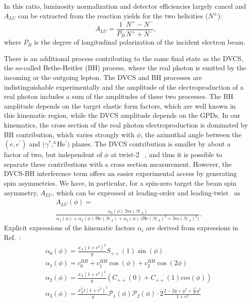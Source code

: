 \documentclass[twocolumn,nofootinbib,showpacs,prl,superscriptaddress,secnumarabic,amssymb,nobibnotes,aps,floatfix]{revtex4}
\begin{document}
In this ratio, luminosity normalization and
detector efficiencies largely cancel and $A_{LU}$ can be 
extracted from the reaction yields for the two helicities ($N^{\pm}$):
\begin{equation}
A_{LU} = \frac{1}{P_{B}} \frac{N^{+} - N^{-}}{N^{+} + N^{-} },
\end{equation}
where $P_{B}$ is the degree of longitudinal polarization of the incident electron beam.

There is an additional process contributing to the same final state as the 
DVCS, the so-called Bethe-Heitler (BH) process, where the real photon is 
emitted by the incoming or the outgoing lepton. The DVCS and BH processes are 
indistinguishable experimentally and the amplitude of the electroproduction of 
a real photon includes a sum of the amplitudes of these two processes. The BH 
amplitude depends on the target elastic form factors, which are well known in 
this kinematic region, while the DVCS amplitude depends on the GPDs. In our 
kinematics, the cross section of the real photon electroproduction is dominated 
by BH contribution, which varies strongly with $\phi$, the azimuthal angle 
between the $(e,e^\prime)$ and $(\gamma^*,^4$He$^\prime)$ planes. The DVCS 
contribution is smaller by about a factor of two, but independent of $\phi$ at twist-2~%
\cite{Belitsky:2001ns}, and thus it is possible to separate these contributions 
with a cross section measurement. However, the DVCS-BH interference term offers 
an easier experimental access by generating spin asymmetries. We have, in 
particular, for a spin-zero target the beam spin asymmetry, $A_{LU}$, which 
can be expressed at leading-order and leading-twist~\cite{Kirchner:2003wt,
Belitsky:2008bz} as
\begin{equation}
\begin{split}
&A_{LU}(\phi) = \\
&\frac{\alpha_{0}(\phi) \, \Im m(\mathcal{H}_{A})}
{\alpha_{1}(\phi) + \alpha_{2}(\phi) \, \Re e(\mathcal{H}_{A}) + \alpha_{3}(\phi) \, 
\big( \Re e(\mathcal{H}_{A})^{2} + \Im m(\mathcal{H}_{A})^{2} \big)}.
\end{split}
\label{eq:A_LU-coh}
\end{equation}
Explicit expressions of the kinematic factors $\alpha_i$ are derived from 
expressions in Ref.~\cite{Belitsky:2008bz}:
\begin{equation}
\begin{split}
&\alpha_0 (\phi)  = \frac{x_{A}(1+\epsilon^2)^2}{y} S_{++}(1) \sin(\phi) \\
&\alpha_1 (\phi)  =  c_0^{BH}+c_1^{BH} \cos({\phi})+c_2^{BH} \cos(2\phi) \\
&\alpha_2 (\phi)  =  \frac{x_{A}(1+\epsilon^2)^2}{y}  \left( C_{++}(0) +  
C_{++}(1) cos(\phi) \right) \\
&\alpha_3 (\phi) = \frac{x^{2}_{A}t(1+\epsilon^2)^2}{y} {\mathcal P}_1(\phi) 
{\mathcal P}_2(\phi) \cdot 2 \frac{2-2y+y^2 + \frac{\epsilon^2}{2}y^2}{1 + 
\epsilon^2}
\end{split}
\end{equation}
\end{document}
